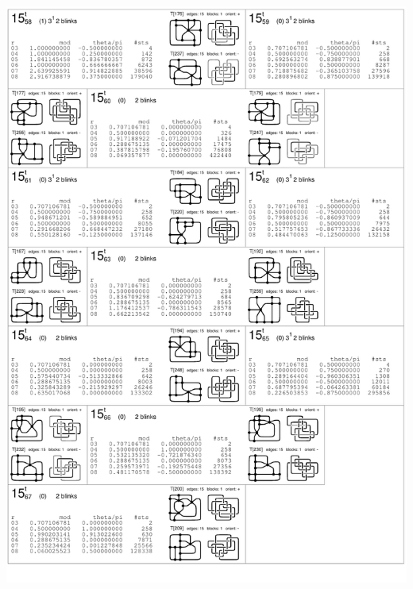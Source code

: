 \begin{center}
 \includegraphics[height=23.5cm]{E.figsbw2/con3catalog013_bw.pdf} \eject

\end{center}

